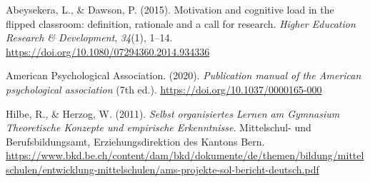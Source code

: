 \documentclass[
  10pt,
  a4paper,
  DIV=11,
  oneside]{scrartcl}
\newlength{\cslhangindent}
\newenvironment{CSLReferences}[2] %
 {\begin{list}{}{%
  \setlength{\itemindent}{0pt}
  \setlength{\leftmargin}{0pt}
  \setlength{\parsep}{0pt}
  \ifodd #1
   \setlength{\leftmargin}{\cslhangindent}
   \setlength{\itemindent}{-1\cslhangindent}
  \fi
  \setlength{\itemsep}{#2\baselineskip}}}
 {\end{list}}
\begin{document}
\label{refs}
\begin{CSLReferences}{1}{0}
Abeysekera, L., \& Dawson, P. (2015). Motivation and cognitive load in
the flipped classroom: definition, rationale and a call for research.
\emph{Higher Education Research \& Development}, \emph{34}(1), 1--14.
\url{https://doi.org/10.1080/07294360.2014.934336}

American Psychological Association. (2020). \emph{Publication manual of
the American psychological association} (7th ed.).
\url{https://doi.org/10.1037/0000165-000}

Hilbe, R., \& Herzog, W. (2011). \emph{Selbst organisiertes Lernen am
Gymnasium Theoretische Konzepte und empirische Erkenntnisse}.
Mittelschul- und Berufsbildungsamt, Erziehungsdirektion des Kantons
Bern.
\url{https://www.bkd.be.ch/content/dam/bkd/dokumente/de/themen/bildung/mittelschulen/entwicklung-mittelschulen/ams-projekte-sol-bericht-deutsch.pdf}

\end{CSLReferences}
\end{document}

